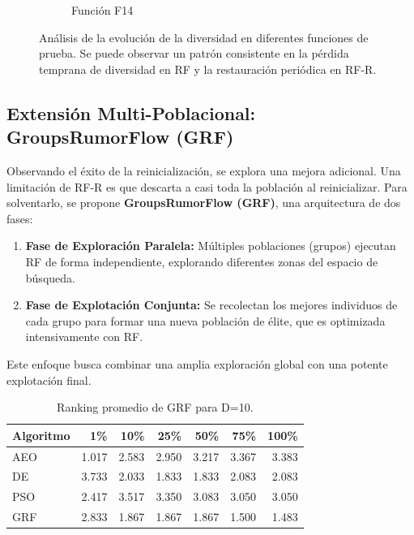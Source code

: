 \documentclass[11pt,a4paper]{article}
\begin{document}
\begin{figure}[h!]
\begin{subfigure}[b]{0.45\textwidth}
        \caption{Función F14}
        \label{fig:f14_div}
    \end{subfigure}
    \caption{Análisis de la evolución de la diversidad en diferentes funciones de prueba. Se puede observar un patrón consistente en la pérdida temprana de diversidad en RF y la restauración periódica en RF-R.}
    \label{fig:individual_div}
\end{figure}

\subsection{Extensión Multi-Poblacional: GroupsRumorFlow (GRF)}
Observando el éxito de la reinicialización, se explora una mejora 
adicional. Una limitación de RF-R es que descarta a casi toda la 
población al reinicializar. Para solventarlo, se propone 
\textbf{GroupsRumorFlow (GRF)}, una arquitectura de dos fases:
\begin{enumerate}
    \item \textbf{Fase de Exploración Paralela:} Múltiples poblaciones 
    (grupos) ejecutan RF de forma independiente, explorando diferentes 
    zonas del espacio de búsqueda.
    \item \textbf{Fase de Explotación Conjunta:} Se recolectan los 
    mejores individuos de cada grupo para formar una nueva población 
    de élite, que es optimizada intensivamente con RF.
\end{enumerate}

Este enfoque busca combinar una amplia exploración global con una potente explotación final.

\begin{table}[h!]
\centering \caption{Ranking promedio de GRF para D=10.} \label{tab:grf_d10}
\begin{tabular}{lrrrrrr} \toprule Algoritmo & 1\% & 10\% & 25\% & 50\% & 75\% & 100\% \\ \midrule 
AEO & 1.017 & 2.583 & 2.950 & 3.217 & 3.367 & 3.383 \\
DE  & 3.733 & 2.033 & 1.833 & 1.833 & 2.083 & 2.083 \\
PSO & 2.417 & 3.517 & 3.350 & 3.083 & 3.050 & 3.050 \\
GRF & 2.833 & 1.867 & 1.867 & 1.867 & 1.500 & 1.483 \\
\bottomrule \end{tabular} \end{table}
\end{document}
